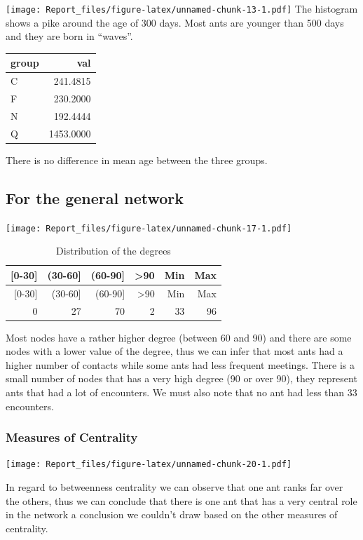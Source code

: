\documentclass[
]{article}
\begin{document}
\texttt{[image: Report\_files/figure-latex/unnamed-chunk-13-1.pdf]} The
histogram shows a pike around the age of 300 days. Most ants are younger
than 500 days and they are born in ``waves''.

\begin{longtable}[]{@{}lr@{}}
\toprule
group & val\tabularnewline
\midrule
\endhead
C & 241.4815\tabularnewline
F & 230.2000\tabularnewline
N & 192.4444\tabularnewline
Q & 1453.0000\tabularnewline
\bottomrule
\end{longtable}

There is no difference in mean age between the three groups.

\hypertarget{for-the-general-network}{%
\subsection{For the general network}\label{for-the-general-network}}

\texttt{[image: Report\_files/figure-latex/unnamed-chunk-17-1.pdf]}

\begin{longtable}[]{@{}rrrrrr@{}}
\caption{Distribution of the degrees}\tabularnewline
\toprule
{[}0-30{]} & (30-60{]} & (60-90{]} & \textgreater90 & Min &
Max\tabularnewline
\midrule
\endfirsthead
\toprule
{[}0-30{]} & (30-60{]} & (60-90{]} & \textgreater90 & Min &
Max\tabularnewline
\midrule
\endhead
0 & 27 & 70 & 2 & 33 & 96\tabularnewline
\bottomrule
\end{longtable}

Most nodes have a rather higher degree (between 60 and 90) and there are
some nodes with a lower value of the degree, thus we can infer that most
ants had a higher number of contacts while some ants had less frequent
meetings. There is a small number of nodes that has a very high degree
(90 or over 90), they represent ants that had a lot of encounters. We
must also note that no ant had less than 33 encounters.

\hypertarget{measures-of-centrality}{%
\subsubsection{Measures of Centrality}\label{measures-of-centrality}}

\texttt{[image: Report\_files/figure-latex/unnamed-chunk-20-1.pdf]}

In regard to betweenness centrality we can observe that one ant ranks
far over the others, thus we can conclude that there is one ant that has
a very central role in the network a conclusion we couldn't draw based
on the other measures of centrality.
\end{document}
